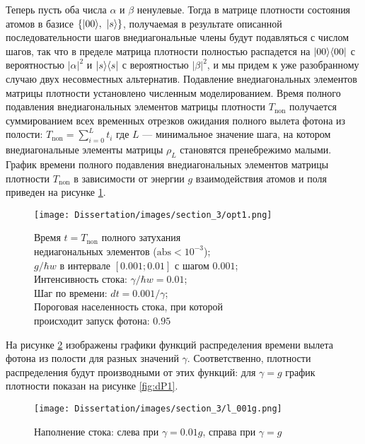 Теперь пусть оба числа $\alpha$ и $\beta$ ненулевые. Тогда в матрице плотности состояния атомов в базисе $\{|00\rangle,~|s\rangle\}$, получаемая в результате описанной последовательности шагов внедиагональные члены будут подавляться с числом шагов, так что в пределе матрица плотности полностью распадется на $|00\rangle\langle 00|$ с вероятностью $|\alpha|^2$ и $|s\rangle\langle s|$ с вероятностью $|\beta|^2$, и мы придем к уже разобранному случаю двух несовместных альтернатив. Подавление внедиагональных элементов матрицы плотности установлено численным моделированием. Время полного подавления внедиагональных элементов матрицы плотности $T_{\text{non}}$ получается суммированием всех временных отрезков ожидания полного вылета фотона из полости: $T_{\text{non}}=\sum\limits_{i=0}^Lt_i$ где $L$ --- минимальное значение шага, на котором внедиагональные элементы матрицы $\rho_L$ становятся пренебрежимо малыми. График времени полного подавления внедиагональных элементов матрицы плотности $T_{\text{non}}$ в зависимости от энергии $g$ взаимодействия атомов и поля приведен на рисунке \ref{fig:decoh}. 
\begin{figure}[h]
	\noindent\centering\texttt{[image: Dissertation/images/section\_3/opt1.png]}
	\captionsetup{format=hang,width=0.9\textwidth,justification=centering,singlelinecheck=no}
	
	\caption{Время $t=T_{\text{non}}$ полного затухания\\недиагональных элементов ($\mathrm{abs} < 10^{-3}$);\\
		$g/\hbar w$ в интервале $[0.001; 0.01]$ с шагом $0.001$;\\
		Интенсивность стока: $\gamma / \hbar w = 0.01$;\\
		Шаг по времени: $dt = 0.001 /\gamma$;\\
		Пороговая населенность стока, при которой\\происходит запуск фотона: $0.95$}
	\label{fig:decoh}
\end{figure}

На рисунке \ref{fig:0.01} изображены графики функций распределения времени вылета фотона из полости для разных значений $\gamma$. Соответственно, плотности распределения будут производными от этих функций: для $\gamma=g$ график плотности показан на рисунке \ref{fig:dP1}. 

\begin{figure}[ht!]
	\noindent\centering\texttt{[image: Dissertation/images/section\_3/l\_001g.png]}
	\caption{Наполнение стока: слева при $\gamma=0.01g$, справа при $\gamma=g$}
	\label{fig:0.01}
\end{figure}

